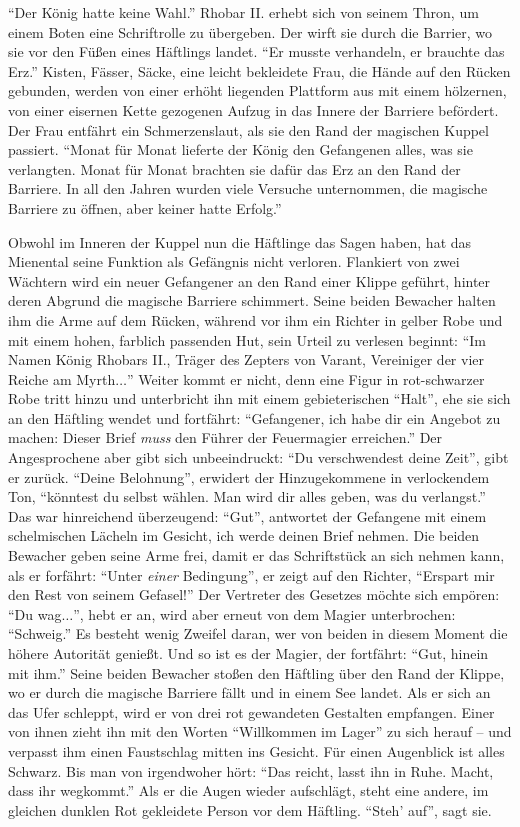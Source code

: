 \documentclass[a5paper,pagesize,numbers=noenddot]{scrbook}
\begin{document}
\enquote{Der König hatte keine Wahl.}
Rhobar II. erhebt sich von seinem Thron, um einem Boten eine Schriftrolle zu übergeben.
Der wirft sie durch die Barrier, wo sie vor den Füßen eines Häftlings landet.
\enquote{Er musste verhandeln, er brauchte das Erz.}
Kisten, Fässer, Säcke, eine leicht bekleidete Frau, die Hände auf den Rücken gebunden, werden von einer erhöht liegenden Plattform aus mit einem hölzernen, von einer eisernen Kette gezogenen Aufzug in das Innere der Barriere befördert.
Der Frau entfährt ein Schmerzenslaut, als sie den Rand der magischen Kuppel passiert.
\enquote{Monat für Monat lieferte der König den Gefangenen alles, was sie verlangten.
Monat für Monat brachten sie dafür das Erz an den Rand der Barriere.
In all den Jahren wurden viele Versuche unternommen, die magische Barriere zu öffnen, aber keiner hatte Erfolg.}

Obwohl im Inneren der Kuppel nun die Häftlinge das Sagen haben, hat das Mienental seine Funktion als Gefängnis nicht verloren.
Flankiert von zwei Wächtern wird ein neuer Gefangener an den Rand einer Klippe geführt, hinter deren Abgrund die magische Barriere schimmert.
Seine beiden Bewacher halten ihm die Arme auf dem Rücken, während vor ihm ein Richter in gelber Robe und mit einem hohen, farblich passenden Hut, sein Urteil zu verlesen beginnt:
\enquote{Im Namen König Rhobars II., Träger des Zepters von Varant, Vereiniger der vier Reiche am Myrth$\ldots$}
Weiter kommt er nicht, denn eine Figur in rot-schwarzer Robe tritt hinzu und unterbricht ihn mit einem gebieterischen \enquote{Halt}, ehe sie sich an den Häftling wendet und fortfährt:
\enquote{Gefangener, ich habe dir ein Angebot zu machen:
Dieser Brief \textit{muss} den Führer der Feuermagier erreichen.}
Der Angesprochene aber gibt sich unbeeindruckt:
\enquote{Du verschwendest deine Zeit}, gibt er zurück.
\enquote{Deine Belohnung}, erwidert der Hinzugekommene in verlockendem Ton, \enquote{könntest du selbst wählen.
Man wird dir alles geben, was du verlangst.}
Das war hinreichend überzeugend:
\enquote{Gut}, antwortet der Gefangene mit einem schelmischen Lächeln im Gesicht, {ich werde deinen Brief nehmen.}
Die beiden Bewacher geben seine Arme frei, damit er das Schriftstück an sich nehmen kann, als er forfährt:
\enquote{Unter \textit{einer} Bedingung}, er zeigt auf den Richter, \enquote{Erspart mir den Rest von seinem Gefasel!}
Der Vertreter des Gesetzes möchte sich empören:
\enquote{Du wag$\ldots$}, hebt er an, wird aber erneut von dem Magier unterbrochen:
\enquote{Schweig.}
Es besteht wenig Zweifel daran, wer von beiden in diesem Moment die höhere Autorität genießt.
Und so ist es der Magier, der fortfährt:
\enquote{Gut, hinein mit ihm.}
Seine beiden Bewacher stoßen den Häftling über den Rand der Klippe, wo er durch die magische Barriere fällt und in einem See landet.
Als er sich an das Ufer schleppt, wird er von drei rot gewandeten Gestalten empfangen.
Einer von ihnen zieht ihn mit den Worten \enquote{Willkommen im Lager} zu sich herauf -- und verpasst ihm einen Faustschlag mitten ins Gesicht.
Für einen Augenblick ist alles Schwarz.
Bis man von irgendwoher hört:
\enquote{Das reicht, lasst ihn in Ruhe.
Macht, dass ihr wegkommt.}
Als er die Augen wieder aufschlägt, steht eine andere, im gleichen dunklen Rot gekleidete Person vor dem Häftling.
\enquote{Steh' auf}, sagt sie.
\end{document}

